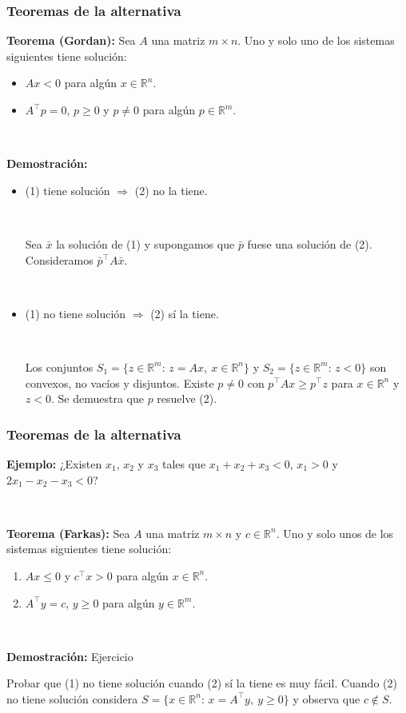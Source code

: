 \documentclass{beamer}
\begin{document}
\begin{frame}
\frametitle{Teoremas de la alternativa}

{\bf Teorema (Gordan):} Sea $A$ una matriz $m\times n$. Uno y solo uno de los sistemas siguientes tiene solución:
\begin{itemize}
\item $Ax<0$ para algún $x\in\mathbb{R}^n$.
\item $A^\top p=0$, $p\geq 0$ y $p\neq 0$ para algún $p\in\mathbb{R}^m$.
\end{itemize} 

\

{\scriptsize

{\bf Demostración:} 

\begin{itemize}
\item (1) tiene solución $\Rightarrow$ (2) no la tiene.

\

Sea $\bar{x}$ la solución de (1) y supongamos que $\bar{p}$ fuese una solución de (2). Consideramos $\bar{p}^\top A\bar{x}$.

\

\item (1) no tiene solución $\Rightarrow$ (2) sí la tiene.

\

Los conjuntos $S_1=\{z\in\mathbb{R}^m:\, z=Ax,\ x\in\mathbb{R}^n\}$ y $S_2=\{z\in\mathbb{R}^m:\, z<0\}$ son convexos, no vacíos y disjuntos. Existe $p\neq 0$ con $p^\top Ax\geq p^\top z$ para $x\in\mathbb{R}^n$ y $z<0$. Se demuestra que $p$ resuelve (2).

\end{itemize}

}

\end{frame}
\begin{frame}
\frametitle{Teoremas de la alternativa}


\textbf{Ejemplo:} ¿Existen $x_1$, $x_2$ y $x_3$ tales que 
$x_1+x_2+x_3<0$, $x_1>0$ y $2x_1-x_2-x_3<0$?


\


{\bf Teorema (Farkas):} Sea $A$ una matriz $m\times n$ y $c\in \mathbb{R}^n$. Uno y solo unos de los sistemas siguientes tiene solución:
\begin{enumerate}
\item $Ax\leq 0$ y $c^\top x>0$  para algún $x\in\mathbb{R}^n$.
\item $A^\top y=c$, $y\geq 0$  para algún $y\in\mathbb{R}^m$.
\end{enumerate} 

\

{\scriptsize

{\bf Demostración:} Ejercicio

Probar que (1) no tiene solución cuando (2) sí la tiene es muy fácil. Cuando (2) no tiene solución considera $S=\{x\in\mathbb{R}^n:\, x=A^\top y,\ y\geq 0\}$ y observa que $c\notin S$.
}






\end{frame}
\end{document}
